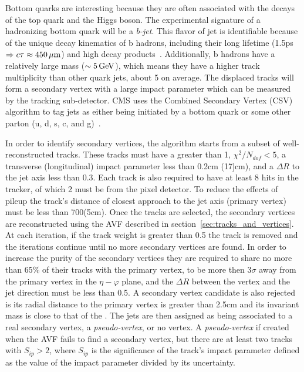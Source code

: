 Bottom quarks are interesting because they are often associated with the decays of the top quark and the Higgs boson.
The experimental signature of a hadronizing bottom quark will be a \textit{b-jet}.
This flavor of jet is identifiable because of the unique decay kinematics of b hadrons, including their long lifetime (1.5\unit{ps}$\Rightarrow{c}\tau\approx450\,\mu\text{m}$) and high \pt decay products~\cite{Olive:2016xmw,PhysRevD.17.171}.
Additionally, b hadrons have a relatively large mass ($\sim5\,\text{Ge\hspace{-.08em}V}$), which means they have a higher track multiplicity than other quark jets, about 5 on average.
The displaced tracks will form a secondary vertex with a large impact parameter which can be measured by the tracking sub-detector.
CMS uses the Combined Secondary Vertex (CSV) algorithm to tag jets as either being initiated by a bottom quark or some other parton (u, d, s, c, and g)~\cite{Weiser:927399,BTV-12-001}.

In order to identify secondary vertices, the algorithm starts from a subset of well-reconstructed tracks.
These tracks must have a \pt greater than 1\gev, $\chi^{2}/N_{dof}<5$, a transverse (longitudinal) impact parameter less than 0.2\unit{cm} (17]\unit{cm}), and a $\Delta{R}$ to the jet axis less than 0.3.
Each track is also required to have at least 8 hits in the tracker, of which 2 must be from the pixel detector.
To reduce the effects of pileup the track's distance of closest approach to the jet axis (primary vertex) must be less than 700\mum (5\unit{cm}).
Once the tracks are selected, the secondary vertices are reconstructed using the AVF described in section~\ref{sec:tracks_and_vertices}.
At each iteration, if the track weight is greater than 0.5 the track is removed and the iterations continue until no more secondary vertices are found.
In order to increase the purity of the secondary vertices they are required to share no more than 65\% of their tracks with the primary vertex, to be more then $3\sigma$ away from the primary vertex in the $\eta-\varphi$ plane, and the $\Delta{R}$ between the vertex and the jet direction must be less than 0.5.
A secondary vertex candidate is also rejected is its radial distance to the primary vertex is greater than 2.5\unit{cm} and its invariant mass is close to that of the \PKz.
The jets are then assigned as being associated to a real secondary vertex, a \textit{pseudo-vertex}, or no vertex.
A \textit{pseudo-vertex} if created when the AVF fails to find a secondary vertex, but there are at least two tracks with $S_{ip}>2$, where $S_{ip}$ is the significance of the track's impact parameter defined as the value of the impact parameter divided by its uncertainty.

